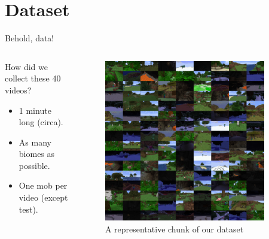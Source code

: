 \documentclass[english]{beamer}
\begin{document}
\section{Dataset}
\begin{frame}{Behold, data!}
  \begin{columns}
    \begin{column}{0.5\textwidth}
      How did we collect these 40 videos?
      \begin{itemize}
        \item 1 minute long (circa).
        \item As many biomes as possible.
        \item One mob per video (except test).
      \end{itemize}
    \end{column}

    \begin{column}{0.5\textwidth}
      \begin{figure}[h]
          \centering
          \includegraphics[width=0.9\textwidth]{../images/dtset_repr.png}
          \caption{A representative chunk of our dataset}
      \end{figure}
    \end{column}

  \end{columns}
\end{frame}
\end{document}
